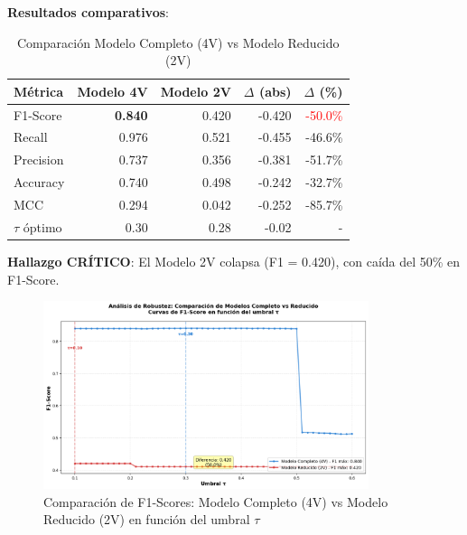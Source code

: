 \documentclass[12pt,letterpaper,twoside]{report}
\begin{document}
\begin{calculobox}
\textbf{Resultados comparativos}:

\begin{table}[H]
\centering
\caption{Comparación Modelo Completo (4V) vs Modelo Reducido (2V)}
\label{tab:robustness_4v_2v}
\begin{tabular}{@{}lrrrr@{}}
\toprule
\textbf{Métrica} & \textbf{Modelo 4V} & \textbf{Modelo 2V} & \textbf{$\Delta$ (abs)} & \textbf{$\Delta$ (\%)} \\
\midrule
F1-Score         & \textbf{0.840} & 0.420 & -0.420 & \textcolor{red}{-50.0\%} \\
Recall           & 0.976          & 0.521 & -0.455 & -46.6\% \\
Precision        & 0.737          & 0.356 & -0.381 & -51.7\% \\
Accuracy         & 0.740          & 0.498 & -0.242 & -32.7\% \\
MCC              & 0.294          & 0.042 & -0.252 & -85.7\% \\
$\tau$ óptimo    & 0.30           & 0.28  & -0.02  & - \\
\bottomrule
\end{tabular}
\end{table}

\textbf{Hallazgo CRÍTICO}: El Modelo 2V colapsa (F1 = 0.420), con caída del 50\% en F1-Score.
\end{calculobox}

\begin{figure}[H]
\centering
\includegraphics[width=0.85\textwidth]{figuras/comparativa_f1_scores.png}
\caption{Comparación de F1-Scores: Modelo Completo (4V) vs Modelo Reducido (2V) en función del umbral $\tau$}
\label{fig:robustez_4v_2v}
\end{figure}
\end{document}
